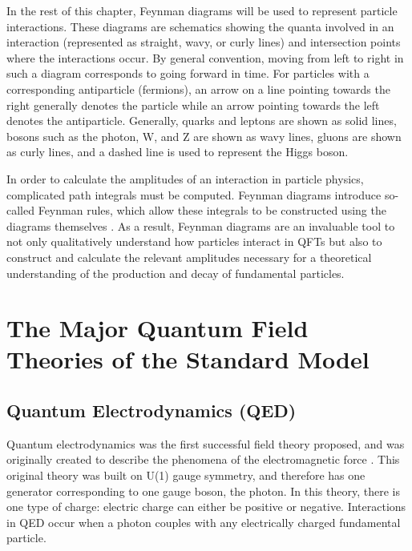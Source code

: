 \documentclass[12pt]{ucsddissertation}
\begin{document}
In the rest of this chapter, Feynman diagrams will be used to represent particle interactions. These diagrams are schematics showing the quanta involved in an interaction (represented as straight, wavy, or curly lines) and intersection points where the interactions occur. By general convention, moving from left to right in such a diagram corresponds to going forward in time. For particles with a corresponding antiparticle (fermions), an arrow on a line pointing towards the right generally denotes the particle while an arrow pointing towards the left denotes the antiparticle. Generally, quarks and leptons are shown as solid lines, bosons such as the photon, W, and Z are shown as wavy lines, gluons are shown as curly lines, and a dashed line is used to represent the Higgs boson.

In order to calculate the amplitudes of an interaction in particle physics, complicated path integrals must be computed. Feynman diagrams introduce so-called Feynman rules, which allow these integrals to be constructed using the diagrams themselves \cite{FeynmanRules}. As a result, Feynman diagrams are an invaluable tool to not only qualitatively understand how particles interact in QFTs but also to construct and calculate the relevant amplitudes necessary for a theoretical understanding of the production and decay of fundamental particles.

\section{The Major Quantum Field Theories of the Standard Model}
\subsection{Quantum Electrodynamics (QED)}\label{sec:QED}
Quantum electrodynamics was the first successful field theory proposed, and was originally created to describe the phenomena of the electromagnetic force \cite{SMOverview}. This original theory was built on U(1) gauge symmetry, and therefore has one generator corresponding to one gauge boson, the photon. In this theory, there is one type of charge: electric charge can either be positive or negative. Interactions in QED occur when a photon couples with any electrically charged fundamental particle. 
\end{document}
